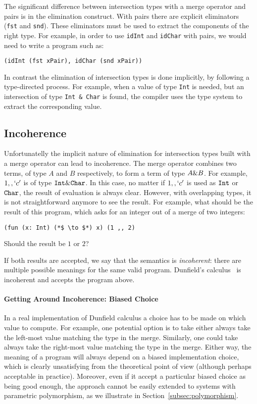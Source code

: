 \noindent The significant difference between intersection types with a
merge operator and pairs is in the elimination construct. With pairs
there are explicit eliminators (\lstinline{fst} and
\lstinline{snd}). These eliminators must be used to extract the
components of the right type. For example, in order to use
\lstinline{idInt} and \lstinline{idChar} with pairs, we would need to
write a program such as:

\begin{lstlisting}
(idInt (fst xPair), idChar (snd xPair))
\end{lstlisting}

\noindent In contrast the elimination of intersection types is done
implicitly, by following a type-directed process. For example,
when a value of type \lstinline{Int} is needed, but an intersection
of type \lstinline{Int & Char} is found, the compiler uses the
type system to extract the corresponding value.

\subsection{Incoherence}\label{subsec:incoherence}
Unfortunatelly the implicit nature of elimination for intersection
types built with a merge operator can lead to incoherence.
The merge operator combines two terms, of type $A$ and $B$
respectively, to form a term of type $A \& B$. For example,
$1 ,, `c'$ is of type $\texttt{Int} \& \texttt{Char}$. In this case, no
matter if $1 ,, `c'$ is used as $\texttt{Int}$ or $\texttt{Char}$, the result
of evaluation is always clear. However, with overlapping types, it is
not straightforward anymore to see the result. For example, what
should be the result of this program, which asks for an integer out of
a merge of two integers:
\begin{lstlisting}
(fun (x: Int) (*$ \to $*) x) (1 ,, 2)
\end{lstlisting}
Should the result be $1$ or $2$?

If both results are accepted, we say that the semantics is
\emph{incoherent}: there are multiple possible meanings for the same
valid program. Dunfield's calculus~\cite{dunfield2014elaborating} is incoherent and accepts the
program above.

\paragraph{Getting Around Incoherence: Biased Choice}
In a real implementation of Dunfield calculus a choice has to be made
on which value to compute. For example, one potential option is to
take either always take the left-most value matching the type in the
merge. Similarly, one could take always take the right-most
value matching the type in the merge. Either way, the meaning
of a program will always depend on a biased implementation choice,
which is clearly unsatisfying from the theoretical point of view
(although perhaps acceptable in practice).
Moreover, even if it accept a particular biased choice as
being good enough, the approach cannot be easily
extended to systems with parametric polymorphism, as we illustrate
in Section~\ref{subsec:polymorphism}.


